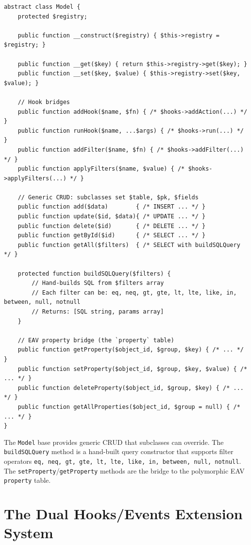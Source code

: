 \documentclass[11pt,a4paper]{article}
\begin{document}
\begin{lstlisting}[caption={\texttt{system/engine/model.php} --- the CRUD bridge (abridged).},label={lst:model}]
abstract class Model {
    protected $registry;

    public function __construct($registry) { $this->registry = $registry; }

    public function __get($key) { return $this->registry->get($key); }
    public function __set($key, $value) { $this->registry->set($key, $value); }

    // Hook bridges
    public function addHook($name, $fn) { /* $hooks->addAction(...) */ }
    public function runHook($name, ...$args) { /* $hooks->run(...) */ }
    public function addFilter($name, $fn) { /* $hooks->addFilter(...) */ }
    public function applyFilters($name, $value) { /* $hooks->applyFilters(...) */ }

    // Generic CRUD: subclasses set $table, $pk, $fields
    public function add($data)        { /* INSERT ... */ }
    public function update($id, $data){ /* UPDATE ... */ }
    public function delete($id)       { /* DELETE ... */ }
    public function getById($id)      { /* SELECT ... */ }
    public function getAll($filters)  { /* SELECT with buildSQLQuery */ }

    protected function buildSQLQuery($filters) {
        // Hand-builds SQL from $filters array
        // Each filter can be: eq, neq, gt, gte, lt, lte, like, in, between, null, notnull
        // Returns: [SQL string, params array]
    }

    // EAV property bridge (the `property` table)
    public function getProperty($object_id, $group, $key) { /* ... */ }
    public function setProperty($object_id, $group, $key, $value) { /* ... */ }
    public function deleteProperty($object_id, $group, $key) { /* ... */ }
    public function getAllProperties($object_id, $group = null) { /* ... */ }
}
\end{lstlisting}

The \texttt{Model} base provides generic CRUD that subclasses can
override. The \texttt{buildSQLQuery} method is a hand-built query
constructor that supports filter operators \texttt{eq, neq, gt, gte,
lt, lte, like, in, between, null, notnull}. The
\texttt{setProperty}/\texttt{getProperty} methods are the bridge to
the polymorphic EAV \texttt{property} table.

\section{The Dual Hooks/Events Extension System}\label{sec:hooks}
\end{document}
